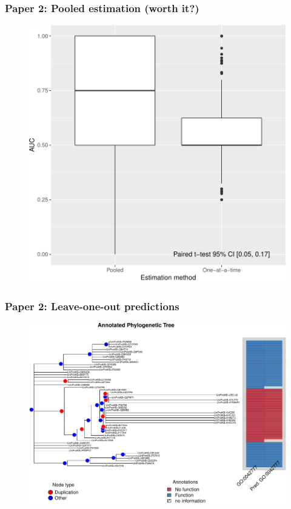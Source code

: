 \documentclass[aspectratio=169, 10pt]{beamer}
\begin{document}
\begin{frame}
\frametitle{Paper 2: Pooled estimation (worth it?)}

\begin{figure}
\centering
\includegraphics[width=.5\linewidth]{comparing-accuracy-1.pdf}
\end{figure}

\end{frame}

\begin{frame}
\frametitle{Paper 2: Leave-one-out predictions}

\begin{figure}
\centering
\includegraphics[width=.7\linewidth]{annotations1.pdf}
\end{figure}

\end{frame}
\end{document}
